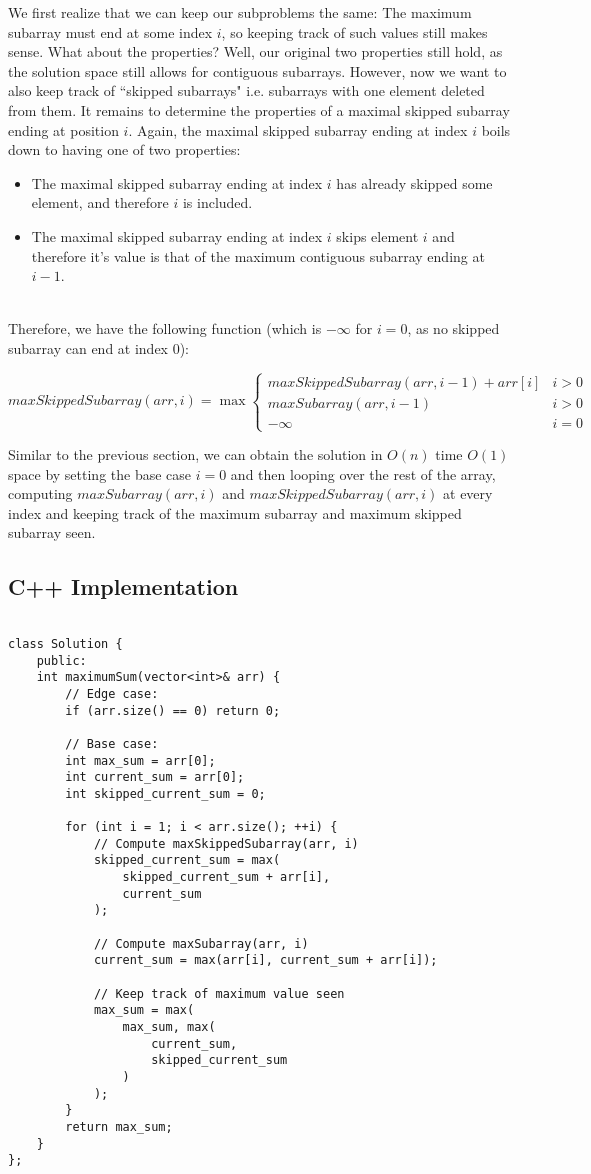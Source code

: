 \documentclass{bmcart}
\begin{document}
We first realize that we can keep our subproblems the same: The maximum subarray must end at some index $i$, so keeping track of such values still makes sense. What about the properties? Well, our original two properties still hold, as the solution space still allows for contiguous subarrays. However, now we want to also keep track of ``skipped subarrays" i.e. subarrays with one element deleted from them. It remains to determine the properties of a maximal skipped subarray ending at position $i$. Again, the maximal skipped subarray ending at index $i$ boils down to having one of two properties:\\

\begin{itemize}
	\item The maximal skipped subarray ending at index $i$ has already skipped some element, and therefore $i$ is included.
	\item The maximal skipped subarray ending at index $i$ skips element $i$ and therefore it's value is that of the maximum contiguous subarray ending at $i-1$. 
\end{itemize}
\ \\

Therefore, we have the following function (which is $-\infty$ for $i=0$, as no skipped subarray can end at index 0):

{\small
\[ maxSkippedSubarray(arr, i) = \max{\begin{cases} 
	maxSkippedSubarray(arr, i - 1) + arr[i] & i > 0\\
	maxSubarray(arr, i - 1) & i > 0 \\
	-\infty & i = 0
	\end{cases}}
\]
}

Similar to the previous section, we can obtain the solution in $O(n)$ time $O(1)$ space by setting the base case $i=0$ and then looping over the rest of the array, computing $ maxSubarray(arr, i)$ and $ maxSkippedSubarray(arr, i)$ at every index and keeping track of the maximum subarray and maximum skipped subarray seen.


\subsection{C++ Implementation}
\begin{lstlisting}

class Solution {
	public:
	int maximumSum(vector<int>& arr) {
		// Edge case:
		if (arr.size() == 0) return 0;
		
		// Base case:
		int max_sum = arr[0];
		int current_sum = arr[0];
		int skipped_current_sum = 0;
		
		for (int i = 1; i < arr.size(); ++i) {
			// Compute maxSkippedSubarray(arr, i)
			skipped_current_sum = max(
				skipped_current_sum + arr[i], 
				current_sum 
			);
			
			// Compute maxSubarray(arr, i)
			current_sum = max(arr[i], current_sum + arr[i]);
			
			// Keep track of maximum value seen
			max_sum = max(
				max_sum, max(
					current_sum, 
					skipped_current_sum
				)
			);
		}
		return max_sum;
	}
};
\end{lstlisting}
\end{document}
